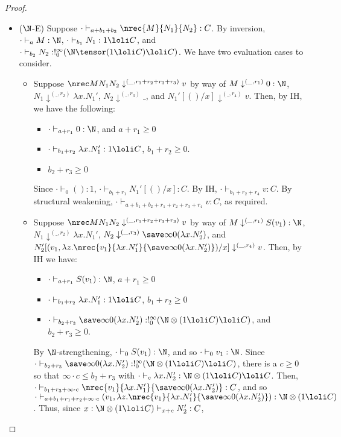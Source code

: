 \begin{proof}
\begin{itemize}
\item ($\N$-E) Suppose $\cdot \vdash_{a+b_1+b_2} \nrec {M} {N_1} {N_2} : C$. By inversion, $\cdot \vdash_a M : \N$, $\cdot \vdash_{b_1} N_1 : 1 \loli C$, and $\cdot \vdash_{b_2} N_2 : !^\infty_0(\N \tensor (1 \loli C) \loli C)$. We have two evaluation cases to consider.
\begin{itemize}
  \item Suppose $\nrec M {N_1} {N_2} \downarrow^{(\_,r_1+r_2+r_3+r_3)} v$ by way of $M \downarrow^{(\_,r_1)} 0 : \N$, $N_1 \downarrow^{(\_,r_2)} \lambda x.N_1'$, $N_2 \downarrow^{(\_,r_3)} \_$, and $N_1'[()/x] \downarrow^{(\_,r_4)} v$. Then, by IH, we have the following:
  \begin{itemize}
    \item $\cdot \vdash_{a+r_1} 0 : \N$, and $a + r_1 \geq 0$
    \item $\cdot \vdash_{b_1+r_2} \lambda x.N_1' : 1 \loli C$, $b_1 + r_2 \geq 0$.
    \item $b_2 + r_3 \geq 0$
  \end{itemize}
  Since $\cdot \vdash_0 () : 1$, $\cdot \vdash_{b_1 + r_1} N_1'[()/x] : C$. By IH, $\cdot \vdash_{b_1 + r_2 + r_4} v : C$. By structural weakening, $\cdot \vdash_{a+b_1+b_2 + r_1 + r_2 + r_3 + r_4} v : C$, as required.
  \item Suppose $\nrec M {N_1} {N_2} \downarrow^{(\_,r_1+r_2+r_3+r_3)} v$ by way of $M \downarrow^{(\_,r_1)} S(v_1) : \N$, $N_1 \downarrow^{(\_,r_2)} \lambda x.N_1'$, $N_2 \downarrow^{(\_,r_3)} \save \infty 0 {(\lambda x.N_2')}$, and $N_2'[(v_1,\lambda z.\nrec {v_1} {\lambda x.N_1'} {\save \infty 0 {(\lambda x.N_2')}})/x] \downarrow^{(\_,r_4)} v$. Then, by IH we have:
  \begin{itemize}
    \item $\cdot \vdash_{a+r_1} S(v_1) : \N$, $a + r_1 \geq 0$
    \item $\cdot \vdash_{b_1 + r_2} \lambda x.N_1' : 1 \loli C$, $b_1 + r_2 \geq 0$
    \item $\cdot \vdash_{b_2 + r_3} \save \infty 0 {(\lambda x.N_2')} : !^\infty_0(\N \otimes (1 \loli C) \loli C)$, and $b_2 + r_3 \geq 0$.
  \end{itemize}
  By $\N$-strengthening, $\cdot \vdash_0 S(v_1) : \N$, and so $\cdot \vdash_0 v_1 : \N$. Since $\cdot \vdash_{b_2 + r_3} \save \infty 0 {(\lambda x.N_2')} : !^\infty_0(\N \otimes (1 \loli C) \loli C)$, there is a $c \geq 0$ so that $\infty \cdot c \leq b_2 + r_3$ with $\cdot \vdash_c \lambda x.N_2' : \N \otimes (1 \loli C) \loli C$. Then, $\cdot \vdash_{b_1 + r_3 + \infty \cdot c} \nrec {v_1} {\lambda x.N_1'} {\save \infty 0 {(\lambda x.N_2')}} : C$, and so $\cdot \vdash_{a+b_1+r_1+r_2 + \infty \cdot c} (v_1,\lambda z.\nrec {v_1} {\lambda x.N_1'} {\save \infty 0 {(\lambda x.N_2')}}) : \N \otimes (1 \loli C)$. Thus, since $x : \N \otimes (1 \loli C) \vdash_{x + c} N_2' : C$,

\end{itemize}
\end{itemize}
\end{proof}
